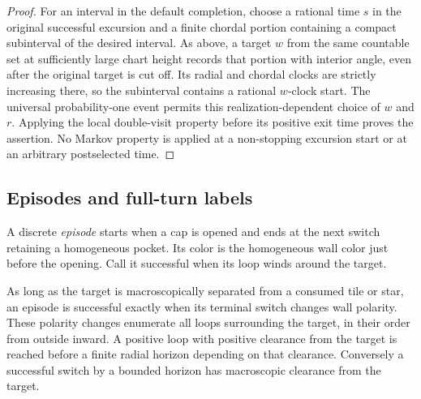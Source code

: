 \begin{proof}
For an interval in the default completion, choose a rational time $s$
in the original successful excursion and a finite chordal portion
containing a compact subinterval of the desired interval.  As above,
a target $w$ from the same countable set at sufficiently large chart
height records that portion with interior angle, even after the
original target is cut off.  Its radial and chordal clocks are strictly
increasing there, so the subinterval contains a rational $w$-clock
start.  The universal probability-one event permits this
realization-dependent choice of $w$ and $r$.  Applying the local
double-visit property before its positive exit time proves the
assertion.  No Markov property is applied at a non-stopping excursion
start or at an arbitrary postselected time.
\end{proof}

\subsection{Episodes and full-turn labels}
\label{loop:episodes}

A discrete \emph{episode} starts when a cap is opened and ends at the
next switch retaining a homogeneous pocket.  Its color is the
homogeneous wall color just before the opening.  Call it successful
when its loop winds around the target.

\begin{lemma}\label{loop:episode-order}
As long as the target is macroscopically separated from a consumed
tile or star, an episode is successful exactly when its terminal
switch changes wall polarity.  These polarity changes enumerate all
loops surrounding the target, in their order from outside inward.
A positive loop with positive clearance from the target is reached
before a finite radial horizon depending on that clearance.
Conversely a successful switch by a bounded horizon has macroscopic
clearance from the target.
\end{lemma}

